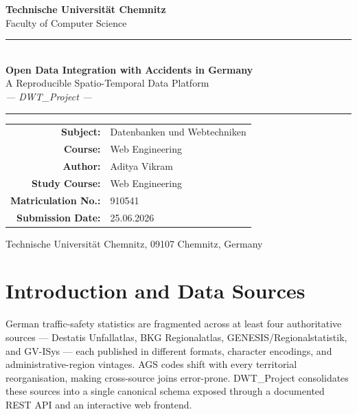 \documentclass[12pt,a4paper]{article}
\begin{document}
\begin{titlepage}
\centering

\vspace*{1cm}

{\LARGE\bfseries Technische Universit\"at Chemnitz}\\[0.5cm]
{\large Faculty of Computer Science}

\vspace{1.5cm}

\rule{\textwidth}{0.4pt}\\[0.5cm]
{\LARGE\bfseries Open Data Integration with Accidents in Germany}\\[0.4cm]
{\large A Reproducible Spatio-Temporal Data Platform}\\[0.3cm]
\textit{--- DWT\_Project ---}\\[0.2cm]
\rule{\textwidth}{0.4pt}

\vspace{1.5cm}

\begin{tabular}{rl}
  \textbf{Subject:}            & Datenbanken und Webtechniken \\[4pt]
  \textbf{Course:}             & Web Engineering \\[4pt]
  \textbf{Author:}             & Aditya Vikram \\[4pt]
  \textbf{Study Course:}       & Web Engineering \\[4pt]
  \textbf{Matriculation No.:}  & 910541 \\[4pt]
  \textbf{Submission Date:}    & 25.06.2026 \\
\end{tabular}

\vfill
{\small Technische Universit\"at Chemnitz, 09107 Chemnitz, Germany}
\end{titlepage}

\tableofcontents
\newpage

\section{Introduction and Data Sources}

German traffic-safety statistics are fragmented across at least four authoritative sources --- Destatis Unfallatlas, BKG Regionalatlas, GENESIS/Regionalstatistik, and GV-ISys --- each published in different formats, character encodings, and administrative-region vintages. AGS codes shift with every territorial reorganisation, making cross-source joins error-prone. DWT\_Project consolidates these sources into a single canonical schema exposed through a documented REST API and an interactive web frontend.
\end{document}
